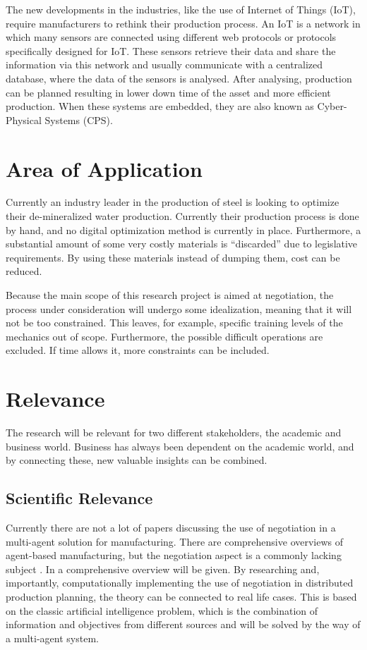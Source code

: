 \begin{mdframed}[style=mystyle, frametitle=IoT and CPS]

	The new developments in the industries, like the use of Internet of Things (IoT), require manufacturers to rethink their production process. An IoT is a network in which many sensors are connected using different web protocols or protocols specifically designed for IoT. These sensors retrieve their data and share the information via this network and usually communicate with a centralized database, where the data of the sensors is analysed. After analysing, production can be planned resulting in lower down time of the asset and more efficient production. When these systems are embedded, they are also known as Cyber-Physical Systems (CPS).
\end{mdframed}


\section{Area of Application}

Currently an industry leader in the production of steel is looking to optimize their de-mineralized water production. Currently their production process is done by hand, and no digital optimization method is currently in place. Furthermore, a substantial amount of some very costly materials is ``discarded'' due to legislative requirements. By using these materials instead of dumping them, cost can be reduced.

Because the main scope of this research project is aimed at negotiation, the process under consideration will undergo some idealization, meaning that it will not be too constrained. This leaves, for example, specific training levels of the mechanics out of scope. Furthermore, the possible difficult operations are excluded.  If time allows it, more constraints can be included.


\section{Relevance}%
The research will be relevant for two different stakeholders, the academic and business world. Business has always been dependent on the academic world, and by connecting these, new valuable insights can be combined.
\subsection{Scientific Relevance}
Currently there are not a lot of papers discussing the use of negotiation in a multi-agent solution for manufacturing. There are comprehensive overviews of agent-based manufacturing, but the negotiation aspect is a commonly lacking subject \citep{leitao2009agent}. In  a comprehensive overview will be given. By researching and, importantly, computationally implementing the use of negotiation in distributed production planning, the theory can be connected to real life cases. This is based on the classic artificial intelligence problem, which is the combination of information and objectives from different sources and will be solved by the way of a multi-agent system.

